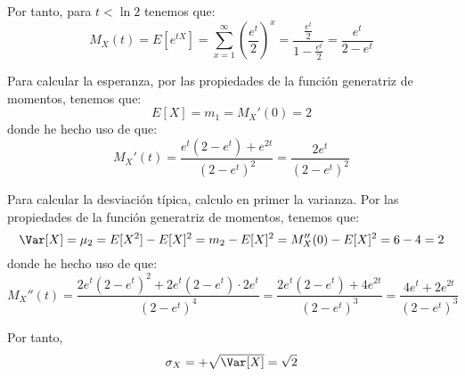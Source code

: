\begin{ejercicio}
\begin{enumerate}
        Por tanto, para $t<\ln 2$ tenemos que:
        \begin{equation*}
            M_X (t) = E[e^{tX}] = \sum_{x=1}^\infty \left(\frac{e^t}{2}\right)^x
            = \frac{\frac{e^t}{2}}{1-\frac{e^t}{2}}
             = \frac{e^t}{2-e^t}
        \end{equation*}

        Para calcular la esperanza, por las propiedades de la función generatriz de momentos, tenemos que:
        \begin{equation*}
            E[X] = m_1 = M_X'(0) = 2
        \end{equation*}
        donde he hecho uso de que:
        \begin{equation*}
            M_X'(t) = \frac{e^t(2-e^t) +e^{2t}}{(2-e^t)^2}
            = \frac{2e^t}{(2-e^t)^2}
        \end{equation*}

        Para calcular la desviación típica, calculo en primer la varianza. Por las propiedades de la función generatriz de momentos, tenemos que:
        \begin{equation*}
            \Var[X] = \mu_2 = E[X^2] - E[X]^2 = m_2 - E[X]^2 = M_X''(0) - E[X]^2 = 6-4 = 2
        \end{equation*}
        donde he hecho uso de que:
        \begin{equation*}
            M_X''(t) = \frac{2e^t(2-e^t)^2 +2e^t(2-e^t)\cdot 2e^t}{(2-e^t)^4}
            = \frac{2e^t(2-e^t) +4e^{2t}}{(2-e^t)^3}
            = \frac{4e^t +2e^{2t}}{(2-e^t)^3}
        \end{equation*}

        Por tanto,
        \begin{equation*}
            \sigma_X = +\sqrt{\Var[X]} = \sqrt{2}
        \end{equation*}
    \end{enumerate}
\end{ejercicio}


